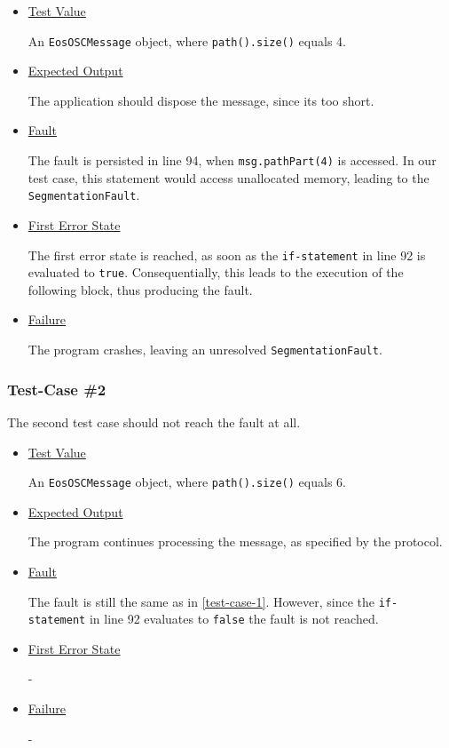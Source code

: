 \documentclass{scrreprt}
\begin{document}
\begin{itemize}
	\item[] \underline{Test Value}
	
	An \texttt{EosOSCMessage} object, where \texttt{path().size()} equals 4.
	
	\item[] \underline{Expected Output}
	
	The application should dispose the message, since its too short.
	
	\item[] \underline{Fault}
	
	The fault is persisted in line 94, when \texttt{msg.pathPart(4)} is accessed. In our test case, this statement would access unallocated memory, leading to the \texttt{SegmentationFault}.
	
	\item[] \underline{First Error State}
	
	The first error state is reached, as soon as the \texttt{if-statement} in line 92 is evaluated to \texttt{true}. Consequentially, this leads to the execution of the following block, thus producing the fault.
	
	\item[] \underline{Failure}
	
	The program crashes, leaving an unresolved \texttt{SegmentationFault}.
\end{itemize}

\subsubsection{Test-Case \#2}
\label{test-case-2}

The second test case should not reach the fault at all.

\begin{itemize}
	\item[] \underline{Test Value}
	
	An \texttt{EosOSCMessage} object, where \texttt{path().size()} equals 6.
	
	\item[] \underline{Expected Output}
	
	The program continues processing the message, as specified by the protocol.
	
	\item[] \underline{Fault}
	
	The fault is still the same as in \vref{test-case-1}. However, since the \texttt{if-statement} in line 92 evaluates to \texttt{false} the fault is not reached.
	
	\item[] \underline{First Error State}
	
	-
	
	\item[] \underline{Failure}
	
	-
\end{itemize}
\end{document}
